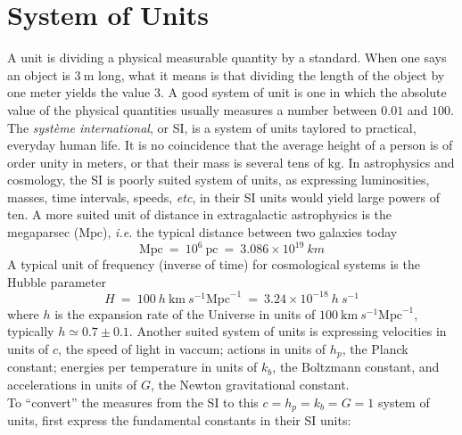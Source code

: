 \chapter{System of Units}
\label{apx:units}
{\color{purple}\titlerule[2.5pt]}
\vspace{4pc}%

A unit is dividing a physical measurable quantity by a standard. When one says an object is $3~\mathrm{m}$ long, what it means is that dividing the length of the object by one meter yields the value $3$. A good system of unit is one in which the absolute value of the physical quantities usually measures a number between $0.01$ and $100$. The \textit{syst\`eme international}, or SI, is a system of units taylored to practical, everyday human life. It is no coincidence that the average height of a person is of order unity in meters, or that their mass is several tens of $\mathrm{kg}$. In astrophysics and cosmology, the SI is poorly suited system of units, as expressing luminosities, masses, time intervals, speeds, \textit{etc}, in their SI units would yield large powers of ten. A more suited unit of distance in extragalactic astrophysics is the megaparsec ($\mathrm{Mpc}$), \textit{i.e.} the typical distance between two galaxies today
\begin{equation*}
\mathrm{Mpc}~=~ 10^6~ \mathrm{pc} ~=~ 3.086 \times 10^{19}~km
\end{equation*} A typical unit of frequency (inverse of time) for cosmological systems is the Hubble parameter
\begin{equation*}
H~=~100~h~\mathrm{km}~s^{-1}\mathrm{Mpc}^{-1} ~= ~3.24 \times 10^{-18}~h ~s^{-1}
\end{equation*} where $h$ is the expansion rate of the Universe in units of $100~\mathrm{km}~s^{-1}\mathrm{Mpc}^{-1}$, typically $h \simeq 0.7 \pm 0.1$. Another suited system of units is expressing velocities in units of $c$, the speed of light in vaccum; actions in units of $h_p$, the Planck constant; energies per temperature in units of $k_b$, the Boltzmann constant, and accelerations in units of $G$, the Newton gravitational constant. \\

To ``convert'' the measures from the SI to this $c=h_p=k_b=G=1$ system of units, first express the fundamental constants in their SI units:

